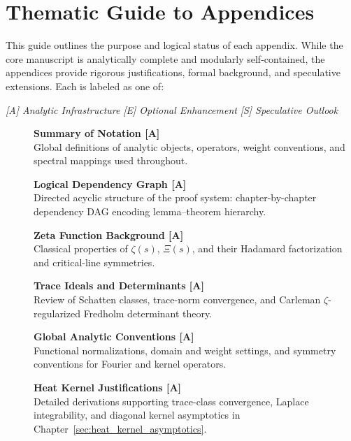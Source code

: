 \section*{Thematic Guide to Appendices}

This guide outlines the purpose and logical status of each appendix. While the core manuscript is analytically complete and modularly self-contained, the appendices provide rigorous justifications, formal background, and speculative extensions. Each is labeled as one of:

\begin{center}
\textit{[A] Analytic Infrastructure} \quad
\textit{[E] Optional Enhancement} \quad
\textit{[S] Speculative Outlook}
\end{center}

\begin{description}
  \item[\textbf{}] \textbf{Summary of Notation [A]} \\
  Global definitions of analytic objects, operators, weight conventions, and spectral mappings used throughout.

  \item[\textbf{}] \textbf{Logical Dependency Graph [A]} \\
  Directed acyclic structure of the proof system: chapter-by-chapter dependency DAG encoding lemma–theorem hierarchy.

  \item[\textbf{}] \textbf{Zeta Function Background [A]} \\
  Classical properties of \( \zeta(s) \), \( \Xi(s) \), and their Hadamard factorization and critical-line symmetries.

  \item[\textbf{}] \textbf{Trace Ideals and Determinants [A]} \\
  Review of Schatten classes, trace-norm convergence, and Carleman \(\zeta\)-regularized Fredholm determinant theory.

  \item[\textbf{}] \textbf{Global Analytic Conventions [A]} \\
  Functional normalizations, domain and weight settings, and symmetry conventions for Fourier and kernel operators.

  \item[\textbf{}] \textbf{Heat Kernel Justifications [A]} \\
  Detailed derivations supporting trace-class convergence, Laplace integrability, and diagonal kernel asymptotics in Chapter~\ref{sec:heat_kernel_asymptotics}.


\end{description}
